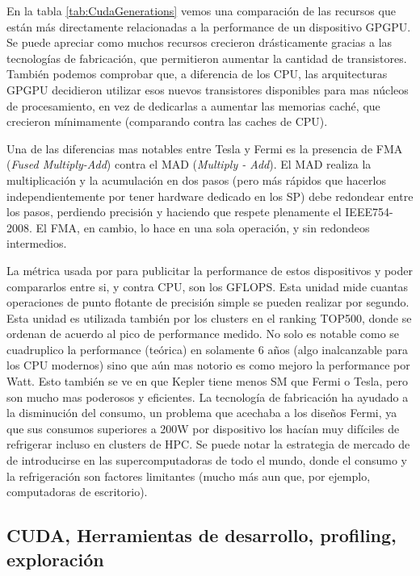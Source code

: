 En la tabla \ref{tab:CudaGenerations} vemos una comparaci\'on de las recursos que est\'an m\'as directamente
relacionadas a la performance de un dispositivo GPGPU. Se puede apreciar como muchos recursos
crecieron dr\'asticamente gracias a las tecnolog\'ias de fabricaci\'on, que permitieron aumentar la
cantidad de transistores. Tambi\'en podemos comprobar que, a diferencia de los CPU, las arquitecturas GPGPU
decidieron utilizar esos nuevos transistores disponibles para mas n\'ucleos de procesamiento, en vez
de dedicarlas a aumentar las memorias cach\'e, que crecieron m\'inimamente (comparando contra las caches de CPU).

Una de las diferencias mas notables entre Tesla y Fermi es la presencia de FMA (\textit{Fused Multiply-Add})
contra el MAD (\textit{Multiply - Add}). El MAD realiza la multiplicaci\'on y la acumulaci\'on
en dos pasos (pero m\'as r\'apidos que hacerlos independientemente por tener hardware dedicado en los SP)
debe redondear entre los pasos, perdiendo precisi\'on y haciendo que respete plenamente el IEEE754-2008. El FMA,
en cambio, lo hace en una sola operaci\'on, y sin redondeos intermedios.

La m\'etrica usada por \nvidia para publicitar la performance de estos dispositivos y poder
compararlos entre si, y contra CPU, son los GFLOPS. Esta unidad mide cuantas operaciones de punto
flotante de precisi\'on simple se pueden realizar por segundo. Esta unidad es utilizada tambi\'en
por los clusters en el ranking TOP500, donde se ordenan de acuerdo al pico de performance medido. No solo
es notable como se cuadruplico la performance (te\'orica) en solamente 6 a\~nos (algo inalcanzable para
los CPU modernos) sino que a\'un mas notorio es como mejoro la performance por Watt. Esto
tambi\'en se ve en que Kepler tiene menos SM que Fermi o Tesla, pero son mucho mas poderosos y
eficientes. La tecnolog\'ia de fabricaci\'on ha ayudado a la disminuci\'on del consumo, un
problema que acechaba a los dise\~nos Fermi, ya que sus consumos superiores a 200W por
dispositivo los hac\'ian muy dif\'iciles de refrigerar incluso en clusters de HPC. Se puede
notar la estrategia de mercado de \nvidia de introducirse en las supercomputadoras de todo
el mundo, donde el consumo y la refrigeraci\'on son factores limitantes (mucho m\'as aun que,
por ejemplo, computadoras de escritorio).

\subsection{CUDA, Herramientas de desarrollo, profiling, exploraci\'on}

